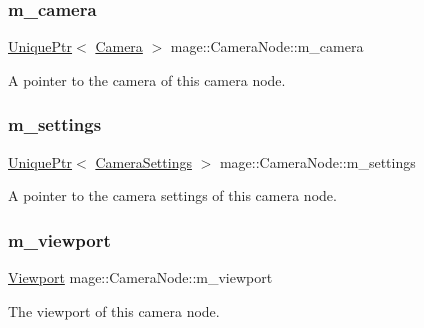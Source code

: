 \subsubsection{\texorpdfstring{m\+\_\+camera}{m\_camera}}
{\footnotesize\ttfamily \hyperlink{namespacemage_a3316d7143a973e37adf1110f2e80ca31}{Unique\+Ptr}$<$ \hyperlink{classmage_1_1_camera}{Camera} $>$ mage\+::\+Camera\+Node\+::m\+\_\+camera\hspace{0.3cm}{\ttfamily [private]}}

A pointer to the camera of this camera node. \hypertarget{classmage_1_1_camera_node_aa8b1f1204534b3ee271e62b7cfe0f833}{}\label{classmage_1_1_camera_node_aa8b1f1204534b3ee271e62b7cfe0f833} 
\subsubsection{\texorpdfstring{m\+\_\+settings}{m\_settings}}
{\footnotesize\ttfamily \hyperlink{namespacemage_a3316d7143a973e37adf1110f2e80ca31}{Unique\+Ptr}$<$ \hyperlink{structmage_1_1_camera_settings}{Camera\+Settings} $>$ mage\+::\+Camera\+Node\+::m\+\_\+settings\hspace{0.3cm}{\ttfamily [private]}}

A pointer to the camera settings of this camera node. \hypertarget{classmage_1_1_camera_node_a338e6f3112a167a7f81de59c7e33e87b}{}\label{classmage_1_1_camera_node_a338e6f3112a167a7f81de59c7e33e87b} 
\subsubsection{\texorpdfstring{m\+\_\+viewport}{m\_viewport}}
{\footnotesize\ttfamily \hyperlink{classmage_1_1_viewport}{Viewport} mage\+::\+Camera\+Node\+::m\+\_\+viewport\hspace{0.3cm}{\ttfamily [private]}}

The viewport of this camera node. 